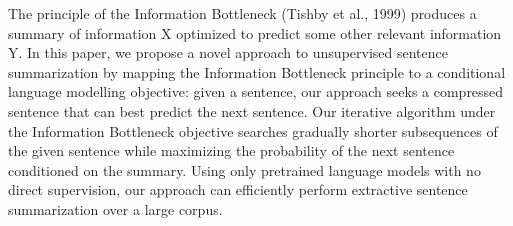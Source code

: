 The principle of the Information Bottleneck (Tishby et al., 1999) 
produces a summary of information X optimized to predict some other relevant information Y. In this paper, we propose a novel approach to unsupervised sentence summarization by mapping the Information Bottleneck principle to a conditional language modelling objective: given a sentence, our approach seeks a compressed sentence that can best predict the next sentence.  Our iterative algorithm under the Information Bottleneck objective searches gradually shorter subsequences of the given sentence while maximizing the probability of the next sentence conditioned on the summary. Using only pretrained language models with no direct supervision, our approach can efficiently perform extractive sentence summarization over a large corpus.